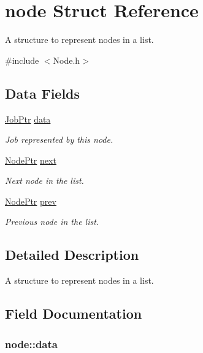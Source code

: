 \hypertarget{structnode}{
\section{node Struct Reference}
\label{structnode}
}


A structure to represent nodes in a list.  




{\ttfamily \#include $<$Node.h$>$}

\subsection*{Data Fields}
\begin{Indent}{\bf }\par
{\em \label{_amgrpd41d8cd98f00b204e9800998ecf8427e}
 }\begin{DoxyCompactItemize}
\item 
\hyperlink{structjob}{JobPtr} \hyperlink{structnode_a4f98bf1eaeefbf93d38506f4f0c459f5}{data}
\begin{DoxyCompactList}\small\item\em Job represented by this node. \item\end{DoxyCompactList}\item 
\hyperlink{structnode}{NodePtr} \hyperlink{structnode_a29ed78f5e5f0fea79b113e047d18997d}{next}
\begin{DoxyCompactList}\small\item\em Next node in the list. \item\end{DoxyCompactList}\item 
\hyperlink{structnode}{NodePtr} \hyperlink{structnode_a8f67d90e34c478e9dd9a5bd51574c8c4}{prev}
\begin{DoxyCompactList}\small\item\em Previous node in the list. \item\end{DoxyCompactList}\end{DoxyCompactItemize}
\end{Indent}


\subsection{Detailed Description}
A structure to represent nodes in a list. 

\subsection{Field Documentation}
\hypertarget{structnode_a4f98bf1eaeefbf93d38506f4f0c459f5}{
\subsubsection[{data}]{ {\bf node::data}}}
\label{structnode_a4f98bf1eaeefbf93d38506f4f0c459f5}


